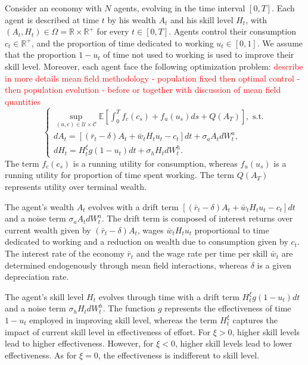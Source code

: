 Consider an economy with $N$ agents, evolving in the time interval $[0,T]$.
Each agent is described at time $t$ by his wealth $A_t$ and his skill level $H_t$,
with $(A_t, H_t) \in \Omega = \mathbb{R} \times \mathbb{R}^+$ for every $t \in [0,T]$.
Agents control their consumption $c_t \in \mathbb{R}^+$, and the proportion of time dedicated to working $u_t \in [0,1]$. 
We assume that the proportion $1 - u_t$ of time not used to working is used to improve their skill level. 
Moreover, each agent face the following optimization problem:
\textcolor{red}{describe in more details mean field methodology - population fixed then optimal control - then population evolution - before or together with discussion of mean field quantities}
\begin{equation}\label{education_model:representative_agent_optimization}
\begin{cases}
        \sup\limits_{(u,c) \in \mathcal{U} \times \mathcal{C}}\mathbb{E} [ \int_0^T f_c(c_s) + f_u(u_s) ds + Q(A_T) ], \text{ s.t.}\\
        d A_t = \left[ (\bar r_t - \delta) A_t + \bar w_t H_t u_t - c_t  \right] dt + \sigma_a A_t d W^a_t,\\
        d H_t = H^\xi_t g(1 - u_t) dt + \sigma_h H_t d W^h_t.
\end{cases}
\end{equation}
The term $f_c(c_s)$ is a running utility for consumption, whereas $f_u(u_s)$ is a running utility for proportion of time spent working.
The term $Q(A_T)$ represents utility over terminal wealth.

The agent's wealth $A_t$ evolves with a drift term $\left[ (\bar r_t - \delta) A_t + \bar w_t H_t u_t - c_t  \right] dt $ and a noise term $\sigma_a A_t d W^a_t$.
The drift term is composed of interest returns over current wealth given by $(\bar r_t - \delta) A_t$, wages $\bar w_t H_t u_t$  proportional to time dedicated to working and a reduction on wealth due to consumption given by $c_t$. The interest rate of the economy $\bar r_t$ and the wage rate per time per skill $\bar w_t$  are determined endogenously through mean field interactions, whereas $\delta$ is a given depreciation rate. 

The agent's skill level $H_t$ evolves through time with a drift term $H^\xi_t g(1 - u_t) dt$ and a noise term $\sigma_h H_t dW^h_t$.
The function $g$ represents the effectiveness of time $1 - u_t$ employed in improving skill level,
 whereas the term $H_t^\xi$ captures the impact of current skill level in effectiveness of effort.
 For $\xi > 0$, higher skill levels lead to higher effectiveness.
  However, for $\xi < 0$, higher skill levels lead to lower effectiveness.
  As for $\xi = 0$, the effectiveness is indifferent to skill level.

